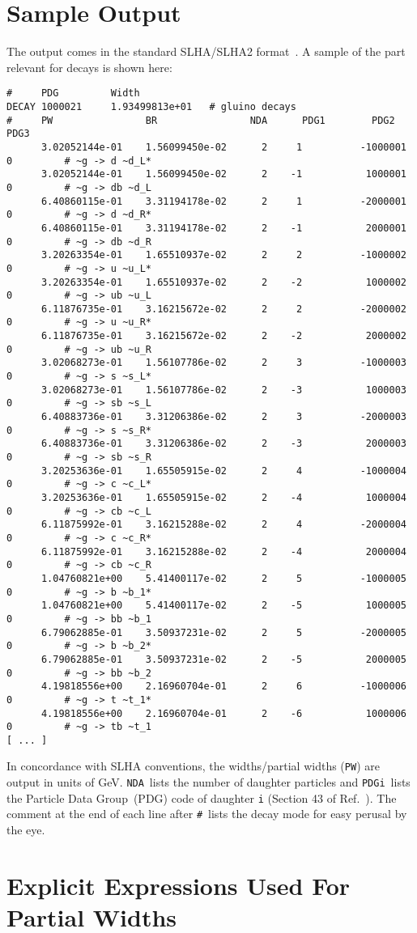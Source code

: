 \documentclass[final,3p,times,pdflatex]{elsarticle}
\def\code#1{{\tt #1}}
\begin{document}
\section{Sample Output \label{sec:out}}
The output comes in the standard SLHA/SLHA2
format~\cite{Skands:2003cj,Allanach:2008qq}. A sample of the part relevant for
decays is shown here:
{\small
\begin{verbatim}
#     PDG         Width             
DECAY 1000021     1.93499813e+01   # gluino decays
#     PW                BR                NDA      PDG1        PDG2        PDG3       
      3.02052144e-01    1.56099450e-02      2     1          -1000001     0         # ~g -> d ~d_L*
      3.02052144e-01    1.56099450e-02      2    -1           1000001     0         # ~g -> db ~d_L
      6.40860115e-01    3.31194178e-02      2     1          -2000001     0         # ~g -> d ~d_R*
      6.40860115e-01    3.31194178e-02      2    -1           2000001     0         # ~g -> db ~d_R
      3.20263354e-01    1.65510937e-02      2     2          -1000002     0         # ~g -> u ~u_L*
      3.20263354e-01    1.65510937e-02      2    -2           1000002     0         # ~g -> ub ~u_L
      6.11876735e-01    3.16215672e-02      2     2          -2000002     0         # ~g -> u ~u_R*
      6.11876735e-01    3.16215672e-02      2    -2           2000002     0         # ~g -> ub ~u_R
      3.02068273e-01    1.56107786e-02      2     3          -1000003     0         # ~g -> s ~s_L*
      3.02068273e-01    1.56107786e-02      2    -3           1000003     0         # ~g -> sb ~s_L
      6.40883736e-01    3.31206386e-02      2     3          -2000003     0         # ~g -> s ~s_R*
      6.40883736e-01    3.31206386e-02      2    -3           2000003     0         # ~g -> sb ~s_R
      3.20253636e-01    1.65505915e-02      2     4          -1000004     0         # ~g -> c ~c_L*
      3.20253636e-01    1.65505915e-02      2    -4           1000004     0         # ~g -> cb ~c_L
      6.11875992e-01    3.16215288e-02      2     4          -2000004     0         # ~g -> c ~c_R*
      6.11875992e-01    3.16215288e-02      2    -4           2000004     0         # ~g -> cb ~c_R
      1.04760821e+00    5.41400117e-02      2     5          -1000005     0         # ~g -> b ~b_1*
      1.04760821e+00    5.41400117e-02      2    -5           1000005     0         # ~g -> bb ~b_1
      6.79062885e-01    3.50937231e-02      2     5          -2000005     0         # ~g -> b ~b_2*
      6.79062885e-01    3.50937231e-02      2    -5           2000005     0         # ~g -> bb ~b_2
      4.19818556e+00    2.16960704e-01      2     6          -1000006     0         # ~g -> t ~t_1*
      4.19818556e+00    2.16960704e-01      2    -6           1000006     0         # ~g -> tb ~t_1
[ ... ]
\end{verbatim}}
In concordance with SLHA conventions, the widths/partial widths
(\code{PW}) are output 
in units 
of GeV. \code{NDA}~lists the number of daughter particles and
\code{PDGi}~lists the
Particle Data Group~(PDG) code of daughter \code{i} (Section 43 of
Ref.~\cite{Olive:2016xmw}). 
The comment at the end of each line after \code{\#}~lists the decay
mode for easy perusal by the eye.
\section{Explicit Expressions Used For Partial Widths \label{sec:exp}}





\end{document}
